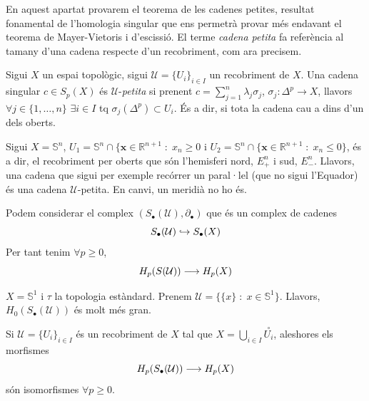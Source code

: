 \documentclass[../main.tex]{subfiles}
\begin{document}
En aquest apartat provarem el teorema de les cadenes petites, resultat fonamental de l'homologia singular que ens permetrà provar més endavant el teorema de Mayer-Vietoris i d'escissió. El terme \textit{cadena petita} fa referència al tamany d'una cadena respecte d'un recobriment, com ara precisem.

\begin{defi}
Sigui $X$ un espai topològic, sigui $\mathcal{U} = \{U_i\}_{i\in I}$ un recobriment de $X$. Una cadena singular $c\in S_p(X)$ és $\mathcal{U}$-\textit{petita} si prenent $c = \sum_{j=1}^n\lambda_j\sigma_j$, $\sigma_j:\Delta^p\rightarrow X$, llavors $\forall j\in\{1,\ldots,n\}$ $\exists i\in I$ tq $\sigma_j(\Delta^p)\subset U_i$. És a dir, si tota la cadena cau a dins d'un dels oberts.
\end{defi}


\begin{ej}
Sigui $X = \mathbb{S}^n$, $U_1 = \mathbb{S}^n\cap\{\mathbf{x}\in\mathbb{R}^{n+1}\;:\;x_n\geq 0$ i $U_2 = \mathbb{S}^n\cap\{\mathbf{x}\in\mathbb{R}^{n+1}\;:\;x_n\leq 0\}$, és a dir, el recobriment per oberts que són l'hemisferi nord, $E_+^n$ i sud, $E_-^n$. Llavors, una cadena que sigui per exemple recórrer un paral·lel (que no sigui l'Equador) és una cadena $\mathcal{U}$-petita. En canvi, un meridià no ho és.
\end{ej}


Podem considerar el complex $(S_\bullet(\mathcal{U}),\partial_\bullet)$ que és un complex de cadenes
\begin{equation}
    \notag
    S_\bullet(\mathcal{U})\hookrightarrow S_\bullet(X)
\end{equation}
Per tant tenim $\forall p\geq 0$,
\begin{equation}
    \notag
    H_p(S(\mathcal{U}))\longrightarrow H_p(X)
\end{equation}
\begin{ej}
$X = \mathbb{S}^1$ i $\tau$ la topologia estàndard. Prenem $\mathcal{U} = \{\{x\}\;:\;x\in\mathbb{S}^1\}$. Llavors, $H_0(S_\bullet(\mathcal{U}))$ és molt més gran.
\end{ej}



\begin{ter}
 Si $\mathcal{U} = \{U_i\}_{i\in I}$ és un recobriment de $X$ tal que $X = \bigcup_{i\in I} \overset{\circ}{U_i}$, aleshores els morfismes
\begin{equation}
    \notag
    H_p(S_\bullet(\mathcal{U}))\longrightarrow H_p(X)
\end{equation}
són isomorfismes $\forall p\geq 0$.
\end{ter}
\end{document}
